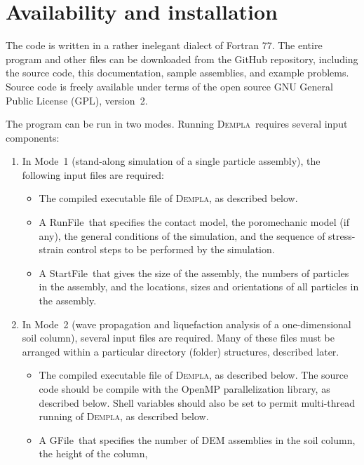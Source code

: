 \documentclass[letterpaper,11pt]{article}
\newcommand{\Dempla}{\textsc{Dempla}}
\newcommand{\RunFile}{\textsf{RunFile}}
\newcommand{\StartFile}{\textsf{StartFile}}
\newcommand{\GFile}{\textsf{GFile}}
\begin{document}
\section{Availability and installation}\label{sec:installation}
The code is written in a rather inelegant dialect of Fortran 77.
The entire program and other files can be downloaded from the
GitHub repository,
including the source code, this documentation,
sample assemblies, and example problems.
Source code is freely available under terms of the open source GNU General
Public License (GPL), version~2.
\par
The program can be run in two modes.
Running \Dempla\ requires several input components:
\begin{enumerate}
	\item
	  In Mode~1
	  (stand-along simulation of a single particle assembly),
	  the following input files are required:
	  \begin{itemize}
	     \item
	       The compiled executable file of \Dempla,
	       as described below.
	     \item
	       A \RunFile\ that specifies the contact model,
	       the poromechanic model (if any),
	       the general conditions of the simulation,
	       and the sequence of stress-strain control steps
	       to be performed by the simulation.
	     \item
	       A \StartFile\ that gives the size of the assembly,
	       the numbers of particles in the assembly,
	       and the locations, sizes and orientations of
	       all particles in the assembly.
	  \end{itemize}
    \item
      In Mode~2 (wave propagation and liquefaction
      analysis of a one-dimensional soil column),
      several input files are required.
      Many of these files must be arranged within a particular
      directory (folder) structures, described later.
      \begin{itemize}
      	\item
          The compiled executable file of \Dempla, as described below.
          The source code should be compile with the OpenMP parallelization
          library, as described below.
          Shell variables should also be set to permit multi-thread
          running of \Dempla, as described below.
        \item
          A \GFile\ that specifies the number of DEM assemblies
          in the soil column, the height of the column,

\end{itemize}
\end{enumerate}
\end{document}
